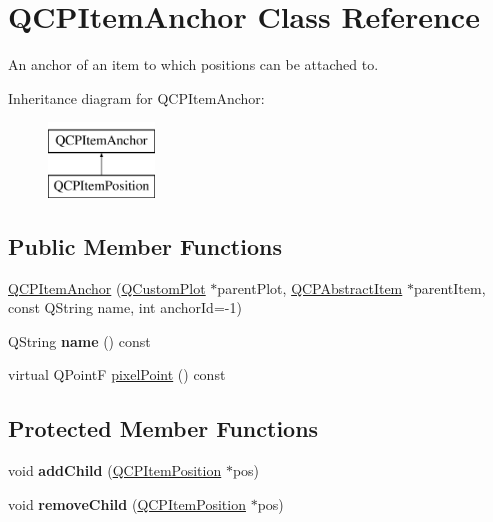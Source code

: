 \hypertarget{classQCPItemAnchor}{\section{Q\-C\-P\-Item\-Anchor Class Reference}
\label{classQCPItemAnchor}
}


An anchor of an item to which positions can be attached to.  


Inheritance diagram for Q\-C\-P\-Item\-Anchor\-:\begin{figure}[H]
\begin{center}
\leavevmode
\includegraphics[height=2.000000cm]{classQCPItemAnchor}
\end{center}
\end{figure}
\subsection*{Public Member Functions}
\begin{DoxyCompactItemize}
\item 
\hyperlink{classQCPItemAnchor_aeb6b681d2bf324db40a915d32ec5624f}{Q\-C\-P\-Item\-Anchor} (\hyperlink{classQCustomPlot}{Q\-Custom\-Plot} $\ast$parent\-Plot, \hyperlink{classQCPAbstractItem}{Q\-C\-P\-Abstract\-Item} $\ast$parent\-Item, const Q\-String name, int anchor\-Id=-\/1)
\item 
\hypertarget{classQCPItemAnchor_ac93984042a58c875e76847dc3e5f75fe}{Q\-String {\bfseries name} () const }\label{classQCPItemAnchor_ac93984042a58c875e76847dc3e5f75fe}

\item 
virtual Q\-Point\-F \hyperlink{classQCPItemAnchor_ae92def8f9297c5d73f5806c586517bb3}{pixel\-Point} () const 
\end{DoxyCompactItemize}
\subsection*{Protected Member Functions}
\begin{DoxyCompactItemize}
\item 
\hypertarget{classQCPItemAnchor_ad11517e2ce5c2f9a798e78fb45e2e0d0}{void {\bfseries add\-Child} (\hyperlink{classQCPItemPosition}{Q\-C\-P\-Item\-Position} $\ast$pos)}\label{classQCPItemAnchor_ad11517e2ce5c2f9a798e78fb45e2e0d0}

\item 
\hypertarget{classQCPItemAnchor_ab65ec61984575f737f43c2bb59dd0d76}{void {\bfseries remove\-Child} (\hyperlink{classQCPItemPosition}{Q\-C\-P\-Item\-Position} $\ast$pos)}\label{classQCPItemAnchor_ab65ec61984575f737f43c2bb59dd0d76}

\end{DoxyCompactItemize}
